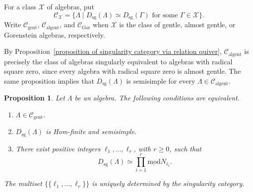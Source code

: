 \documentclass[11pt]{article}
\newcommand{\smod}{\operatorname{\underline{mod}}}
\providecommand{\varLambda}{\Lambda}
\providecommand{\varGamma}{\Gamma}
\newtheorem{proposition}[theorem]{Proposition}
\theoremstyle{definition}
\begin{document}
		For a class $\mathcal X$ of algebras, put
		\[
			\mathcal C_{\mathcal X}=\{\varLambda\mid D_{\mathrm{sg}}(\varLambda)\simeq D_{\mathrm{sg}}(\varGamma)\text{ for some }\varGamma\in\mathcal X\}.
		\]
		Write $\mathcal C_{\mathrm{gent}}$, $\mathcal C_{\mathrm{algent}}$, and $\mathcal C_{\mathrm{Gor}}$ when $\mathcal X$ is the class of gentle, almost gentle, or Gorenstein algebras, respectively.

		By Proposition~\ref{proposition of singularity category via relation quiver}, $\mathcal C_{\mathrm{algent}}$ is precisely the class of algebras singularly equivalent to algebras with radical square zero, since every algebra with radical square zero is almost gentle. The same proposition implies that $D_{\mathrm{sg}}(\varLambda)$ is semisimple for every $\varLambda\in\mathcal C_{\mathrm{algent}}$.

		\begin{proposition}\label{proposition of semisimple singularity categories}
			Let $\varLambda$ be an algebra.	The following conditions are equivalent.
			\begin{enumerate}
				\item $\varLambda\in\mathcal C_{\mathrm{gent}}$.
				\item $D_{\mathrm{sg}}(\varLambda)$ is Hom-finite and semisimple.
				\item There exist positive integers $\ell_1,\ldots,\ell_r$, with $r\geq0$, such that
				\[
					D_{\mathrm{sg}}(\varLambda)\simeq\prod_{i=1}^r\smod N_{\ell_i}.
				\]
			\end{enumerate}
			The multiset $\{\!\{\ell_1,\ldots,\ell_r\}\!\}$ is uniquely determined by the singularity category.
		\end{proposition}
\end{document}
